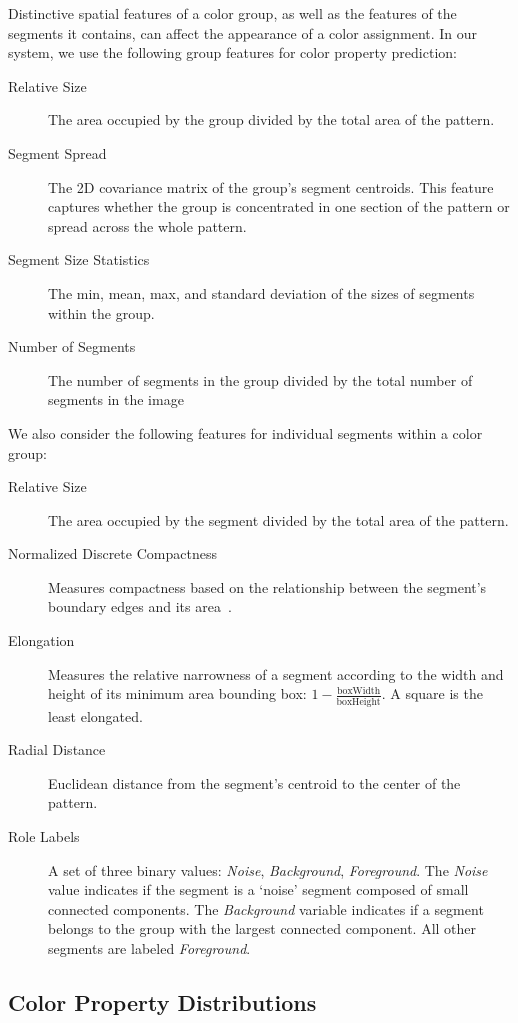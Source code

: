 Distinctive spatial features of a color group, as well as the features of the segments it contains, can affect the appearance of a color assignment. In our system, we use the following group features for color property prediction:
\begin{description}
	\item[Relative Size] The area occupied by the group divided by the total area of the pattern.
  \item[Segment Spread] The 2D covariance matrix of the group's segment centroids. This feature captures whether the group is concentrated in one section of the pattern or spread across the whole pattern.
  \item[Segment Size Statistics] The min, mean, max, and standard deviation of the sizes of segments within the group.
  \item[Number of Segments] The number of segments in the group divided by the total number of segments in the image
\end{description}
We also consider the following features for individual segments within a color group:
\begin{description}
	\item[Relative Size] The area occupied by the segment divided by the total area of the pattern.
  \item[Normalized Discrete Compactness] Measures compactness based on the relationship between the segment's boundary edges and its area~\cite{NormalizedDiscreteCompactness}.
  \item[Elongation] Measures the relative narrowness of a segment according to the width and height of its minimum area bounding box: $1-\frac{\textrm{boxWidth}}{\textrm{boxHeight}}$. A square is the least elongated.
  \item[Radial Distance] Euclidean distance from the segment's centroid to the center of the pattern.
  \item[Role Labels] A set of three binary values: {\emph{Noise}, \emph{Background}, \emph{Foreground}}. The \emph{Noise} value indicates if the segment is a `noise' segment composed of small connected components. The \emph{Background} variable indicates if a segment belongs to the group with the largest connected component. All other segments are labeled \emph{Foreground}.
\end{description}

\subsection{Color Property Distributions}
\label{sec:unaryDistribs}

